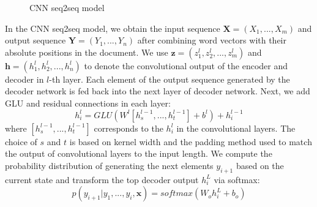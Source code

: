 \begin{figure}[th!]
\centering
{}
\caption{CNN seq2seq model} \label{fig:cnn}
\end{figure}

In the CNN seq2seq model, we obtain the input sequence
$\textbf{X}=(X_{1},...,X_{m})$ and output sequence $\textbf{Y}=(Y_{1},...,Y_{n})$
after combining word vectors with their absolute positions in the document.
We use $\textbf{z}=(z^l_{1}, z^l_{2},..., z^l_{m})$ and
$\textbf{h}=(h^l_{1}, h^l_{2},..., h^l_{n})$
to denote the convolutional output of the encoder and decoder in $l$-th layer.
Each element of the output sequence generated by the decoder network
is fed back into the next layer of decoder network.
Next, we add GLU \cite{DauphinFAG17} and residual connections \cite{HeZRS16} 
in each layer:
\begin{equation}
h^l_{i} \!=\! GLU(W^l[h^{l-1}_{s},...,h^{l-1}_{t}]\!+\!b^l)\!+\!h^{l-1}_{i}
\end{equation}
where $[h^{l-1}_{s},...,h^{l-1}_{t}]$ corresponds to the $h^l_{i}$ in the
convolutional layers. The choice of $s$ and $t$ is based on kernel width 
and the padding method used to match the output of convolutional layers to 
the input length.
We compute the probability distribution of generating the
next elements $y_{i+1}$ based
on the current state and transform the top decoder output $h^L_{i}$ via softmax:
\begin{equation}
p(y_{i+1}|y_{1},...,y_{i},\textbf{x})\!=\!softmax(W_{o}h^L_{i}\!+\!b_{o})
\end{equation}

